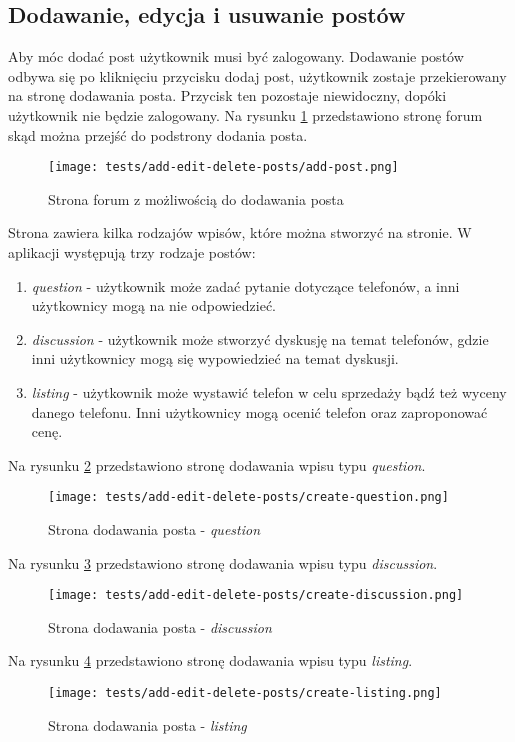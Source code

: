 \subsection{Dodawanie, edycja i usuwanie postów}
Aby móc dodać post użytkownik musi być zalogowany. Dodawanie postów odbywa się po kliknięciu przycisku dodaj post, użytkownik zostaje przekierowany na stronę dodawania posta. Przycisk ten pozostaje niewidoczny, dopóki użytkownik nie będzie zalogowany. Na rysunku \ref{add_post} przedstawiono stronę forum skąd można przejść do podstrony dodania posta.
\begin{figure}[H]
  \centering
  \texttt{[image: tests/add-edit-delete-posts/add-post.png]}
  \caption{Strona forum z możliwością do dodawania posta}
  \label{add_post}
\end{figure}
Strona zawiera kilka rodzajów wpisów, które można stworzyć na stronie. W aplikacji występują trzy rodzaje postów: 
\begin{enumerate}
  \item \textit{question} - użytkownik może zadać pytanie dotyczące telefonów, a inni użytkownicy mogą na nie odpowiedzieć.
  \item \textit{discussion} - użytkownik może stworzyć dyskusję na temat telefonów, gdzie inni użytkownicy mogą się wypowiedzieć na temat dyskusji.
  \item \textit{listing} - użytkownik może wystawić telefon w celu sprzedaży bądź też wyceny danego telefonu. Inni użytkownicy mogą ocenić telefon oraz zaproponować cenę.
\end{enumerate}
Na rysunku \ref{add_question_page} przedstawiono stronę dodawania wpisu typu \textit{question}.
\begin{figure}[H]
  \centering
  \texttt{[image: tests/add-edit-delete-posts/create-question.png]}
  \caption{Strona dodawania posta - \textit{question}}
  \label{add_question_page}
\end{figure}
Na rysunku \ref{add_discussion_post} przedstawiono stronę dodawania wpisu typu \textit{discussion}.
\begin{figure}[H]
  \centering
  \texttt{[image: tests/add-edit-delete-posts/create-discussion.png]}
  \caption{Strona dodawania posta - \textit{discussion}}
  \label{add_discussion_post}
\end{figure}
Na rysunku \ref{add_listing_post} przedstawiono stronę dodawania wpisu typu \textit{listing}.
\begin{figure}[H]
  \centering
  \texttt{[image: tests/add-edit-delete-posts/create-listing.png]}
  \caption{Strona dodawania posta - \textit{listing}}
  \label{add_listing_post}
\end{figure}
